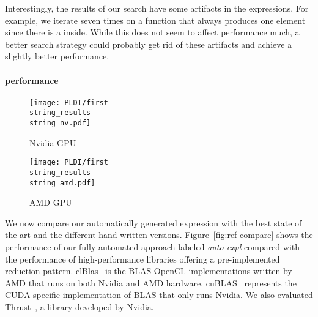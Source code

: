 Interestingly, the results of our search have some artifacts in the expressions.
For example, we iterate seven times on a function that always produces one element since there is a  inside.
While this does not seem to affect performance much, a better search strategy could probably get rid of these artifacts and achieve a slightly better performance.


\paragraph{performance}

\begin{figure*}[t]
  \centering
  \begin{subfigure}[b]{0.475\linewidth}
    \texttt{[image: PLDI/first\\string\_results\\string\_nv.pdf]}
    \caption{Nvidia GPU}
    \label{fig:ref-compare-nv}
  \end{subfigure}
  \begin{subfigure}[b]{0.475\linewidth}
    \texttt{[image: PLDI/first\\string\_results\\string\_amd.pdf]} 
    \caption{AMD GPU}
    \label{fig:ref-compare-amd}
  \end{subfigure}
  \vspace{-1.5em}
  \caption{Performance comparison of hand-written version versus automatically generated ones for two different devices.
  Our automatically explored version \emph{auto-expl} achieves performance on par with the best high performance libraries on both platforms.}
  \label{fig:ref-compare}
\end{figure*}


We now compare our automatically generated expression with the best state of the art and the different hand-written versions.
Figure~\ref{fig:ref-compare} shows the performance of our fully automated approach labeled \emph{auto-expl} compared with the performance of high-performance libraries offering a pre-implemented reduction pattern.
clBlas~\cite{clBlas} is the BLAS OpenCL implementations written by AMD that runs on both Nvidia and AMD hardware.
cuBLAS~\cite{cuBLAS} represents the CUDA-specific implementation of BLAS that only runs Nvidia.
We also evaluated Thrust~\cite{thrust}, a library developed by Nvidia.%

